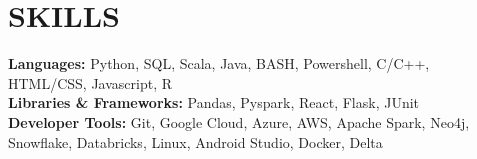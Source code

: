 \documentclass[letterpaper,11pt]{article}
\begin{document}
\section{\textbf{SKILLS}}
    \begin{itemize}[leftmargin=0.05in, label={}]
        \small{\item{
        \textbf{Languages:}{ Python, SQL, Scala, Java, BASH, Powershell, C/C++, HTML/CSS, Javascript, R} \\
        \textbf{Libraries \& Frameworks:}{ Pandas, Pyspark, React, Flask, JUnit} \\
        \textbf{Developer Tools:}{ Git, Google Cloud, Azure, AWS, Apache Spark, Neo4j, Snowflake, Databricks, Linux, Android Studio, Docker, Delta} \\
        }}
    \end{itemize}


\end{document}
